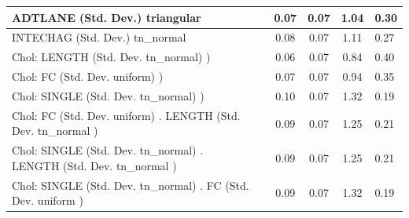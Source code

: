 \begin{table}
\begin{center}
\begin{tabular}{|l|l|c|c|c|l|}
			\hline
			ADTLANE (Std. Dev.) triangular &  & 0.07 & 0.07 & 1.04 & 0.30 \\
			\hline
			INTECHAG (Std. Dev.) tn_normal &  & 0.08 & 0.07 & 1.11 & 0.27 \\
			\hline
			 Chol: LENGTH (Std. Dev. tn_normal) ) &  & 0.06 & 0.07 & 0.84 & 0.40 \\
			\hline
			 Chol: FC (Std. Dev. uniform) ) &  & 0.07 & 0.07 & 0.94 & 0.35 \\
			\hline
			 Chol: SINGLE (Std. Dev. tn_normal) ) &  & 0.10 & 0.07 & 1.32 & 0.19 \\
			\hline
			 Chol: FC (Std. Dev. uniform) . LENGTH (Std. Dev.   tn_normal ) &  & 0.09 & 0.07 & 1.25 & 0.21 \\
			\hline
			 Chol: SINGLE (Std. Dev. tn_normal) . LENGTH (Std. Dev.   tn_normal ) &  & 0.09 & 0.07 & 1.25 & 0.21 \\
			\hline
			 Chol: SINGLE (Std. Dev. tn_normal) . FC (Std. Dev.   uniform ) &  & 0.09 & 0.07 & 1.32 & 0.19 \\
			\hline
		\end{tabular}
	\end{center}
\end{table}